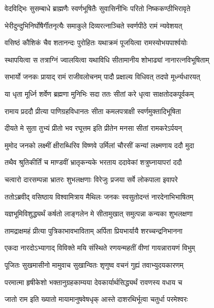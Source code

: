 \twolineshloka
{वेदविद्भिः सुसम्बाधे ब्राह्मणैः स्वर्णभूषितैः}
{सुवासिनीभिः परितो निष्ककण्ठीभिरावृते} %

\twolineshloka
{भेरीदुन्दुभिनिर्घोषैर्गीतनृत्यैः समाकुले}
{दिव्यरत्नाञ्चिते स्वर्णपीठे रामं न्यवेशयत्} %

\twolineshloka
{वसिष्ठं कौशिकं चैव शतानन्दः पुरोहितः}
{यथाक्रमं पूजयित्वा रामस्योभयपार्श्वयोः} %

\twolineshloka
{स्थापयित्वा स तत्राग्निं ज्वालयित्वा यथाविधि}
{सीतामानीय शोभाढ्यां नानारत्नविभूषिताम्} %

\twolineshloka
{सभार्यो जनकः प्रायाद् रामं राजीवलोचनम्}
{पादौ प्रक्षाल्य विधिवत् तदपो मूर्ध्न्यधारयत्} %

\twolineshloka
{या धृता मूर्ध्नि शर्वेण ब्रह्मणा मुनिभिः सदा}
{ततः सीतां करे धृत्वा साक्षतोदकपूर्वकम्} %

\twolineshloka
{रामाय प्रददौ प्रीत्या पाणिग्रहविधानतः}
{सीता कमलपत्राक्षी स्वर्णमुक्तादिभूषिता} %

\twolineshloka
{दीयते मे सुता तुभ्यं प्रीतो भव रघूत्तम}
{इति प्रीतेन मनसा सीतां रामकरेऽर्पयन्} %

\twolineshloka
{मुमोद जनको लक्ष्मीं क्षीराब्धिरिव विष्णवे}
{उर्मिलां चौरसीं कन्यां लक्ष्मणाय ददौ मुदा} %

\twolineshloka
{तथैव श्रुतिकीर्तिं च माण्डवीं भ्रातृकन्यके}
{भरताय ददावेकां शत्रुघ्नायापरां ददौ} %

\twolineshloka
{चत्वारो दारसम्पन्ना भ्रातरः शुभलक्षणाः}
{विरेजुः प्रजया सर्वे लोकपाला इवापरे} %

\twolineshloka
{ततोऽब्रवीद् वसिष्ठाय विश्वामित्राय मैथिलः}
{जनकः स्वसुतोदन्तं नारदेनाभिभाषितम्} %

\twolineshloka
{यज्ञभूमिविशुद्ध्यर्थं कर्षतो लाङ्गलेन मे}
{सीतामुखात् समुत्पन्ना कन्यका शुभलक्षणा} %

\twolineshloka
{तामद्राक्षमहं प्रीत्या पुत्रिकाभावभाविताम्}
{अर्पिता प्रियभार्यायै शरच्चन्द्रनिभानना} %

\twolineshloka
{एकदा नारदोऽभ्यागाद् विविक्ते मयि संस्थिते}
{रणयन्महतीं वीणां गायन्नारायणं विभुम्} %

\twolineshloka
{पूजितः सुखमासीनो मामुवाच सुखान्वितः}
{शृणुष्व वचनं गुह्यं तवाभ्युदयकारणम्} %

\twolineshloka
{परमात्मा हृषीकेशो भक्तानुग्रहकाम्यया}
{देवकार्यार्थसिद्ध्यर्थं रावणस्य वधाय च} %

\twolineshloka
{जातो राम इति ख्यातो मायामानुषवेषधृक्}
{आस्ते दाशरथिर्भूत्वा चतुर्धा परमेश्वरः} %

